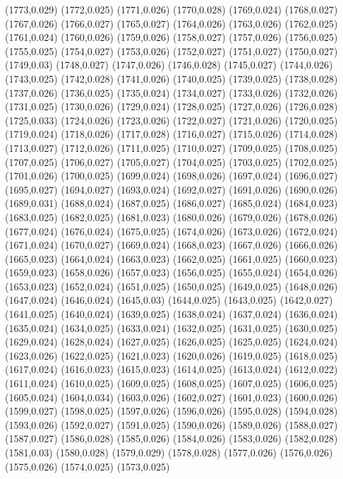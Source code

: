 (1773,0.029)
(1772,0.025)
(1771,0.026)
(1770,0.028)
(1769,0.024)
(1768,0.027)
(1767,0.026)
(1766,0.027)
(1765,0.027)
(1764,0.026)
(1763,0.026)
(1762,0.025)
(1761,0.024)
(1760,0.026)
(1759,0.026)
(1758,0.027)
(1757,0.026)
(1756,0.025)
(1755,0.025)
(1754,0.027)
(1753,0.026)
(1752,0.027)
(1751,0.027)
(1750,0.027)
(1749,0.03)
(1748,0.027)
(1747,0.026)
(1746,0.028)
(1745,0.027)
(1744,0.026)
(1743,0.025)
(1742,0.028)
(1741,0.026)
(1740,0.025)
(1739,0.025)
(1738,0.028)
(1737,0.026)
(1736,0.025)
(1735,0.024)
(1734,0.027)
(1733,0.026)
(1732,0.026)
(1731,0.025)
(1730,0.026)
(1729,0.024)
(1728,0.025)
(1727,0.026)
(1726,0.028)
(1725,0.033)
(1724,0.026)
(1723,0.026)
(1722,0.027)
(1721,0.026)
(1720,0.025)
(1719,0.024)
(1718,0.026)
(1717,0.028)
(1716,0.027)
(1715,0.026)
(1714,0.028)
(1713,0.027)
(1712,0.026)
(1711,0.025)
(1710,0.027)
(1709,0.025)
(1708,0.025)
(1707,0.025)
(1706,0.027)
(1705,0.027)
(1704,0.025)
(1703,0.025)
(1702,0.025)
(1701,0.026)
(1700,0.025)
(1699,0.024)
(1698,0.026)
(1697,0.024)
(1696,0.027)
(1695,0.027)
(1694,0.027)
(1693,0.024)
(1692,0.027)
(1691,0.026)
(1690,0.026)
(1689,0.031)
(1688,0.024)
(1687,0.025)
(1686,0.027)
(1685,0.024)
(1684,0.023)
(1683,0.025)
(1682,0.025)
(1681,0.023)
(1680,0.026)
(1679,0.026)
(1678,0.026)
(1677,0.024)
(1676,0.024)
(1675,0.025)
(1674,0.026)
(1673,0.026)
(1672,0.024)
(1671,0.024)
(1670,0.027)
(1669,0.024)
(1668,0.023)
(1667,0.026)
(1666,0.026)
(1665,0.023)
(1664,0.024)
(1663,0.023)
(1662,0.025)
(1661,0.025)
(1660,0.023)
(1659,0.023)
(1658,0.026)
(1657,0.023)
(1656,0.025)
(1655,0.024)
(1654,0.026)
(1653,0.023)
(1652,0.024)
(1651,0.025)
(1650,0.025)
(1649,0.025)
(1648,0.026)
(1647,0.024)
(1646,0.024)
(1645,0.03)
(1644,0.025)
(1643,0.025)
(1642,0.027)
(1641,0.025)
(1640,0.024)
(1639,0.025)
(1638,0.024)
(1637,0.024)
(1636,0.024)
(1635,0.024)
(1634,0.025)
(1633,0.024)
(1632,0.025)
(1631,0.025)
(1630,0.025)
(1629,0.024)
(1628,0.024)
(1627,0.025)
(1626,0.025)
(1625,0.025)
(1624,0.024)
(1623,0.026)
(1622,0.025)
(1621,0.023)
(1620,0.026)
(1619,0.025)
(1618,0.025)
(1617,0.024)
(1616,0.023)
(1615,0.023)
(1614,0.025)
(1613,0.024)
(1612,0.022)
(1611,0.024)
(1610,0.025)
(1609,0.025)
(1608,0.025)
(1607,0.025)
(1606,0.025)
(1605,0.024)
(1604,0.034)
(1603,0.026)
(1602,0.027)
(1601,0.023)
(1600,0.026)
(1599,0.027)
(1598,0.025)
(1597,0.026)
(1596,0.026)
(1595,0.028)
(1594,0.028)
(1593,0.026)
(1592,0.027)
(1591,0.025)
(1590,0.026)
(1589,0.026)
(1588,0.027)
(1587,0.027)
(1586,0.028)
(1585,0.026)
(1584,0.026)
(1583,0.026)
(1582,0.028)
(1581,0.03)
(1580,0.028)
(1579,0.029)
(1578,0.028)
(1577,0.026)
(1576,0.026)
(1575,0.026)
(1574,0.025)
(1573,0.025)
